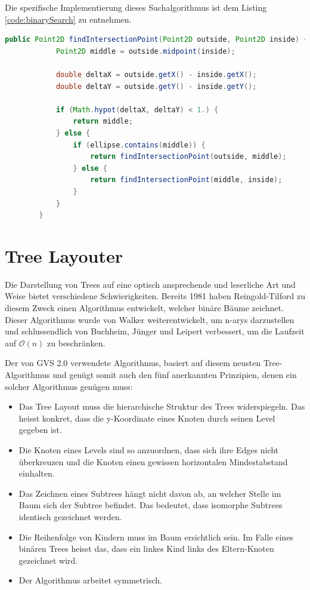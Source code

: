 \documentclass[11pt,a4paper,english,oneside]{book}
\numberwithin{equation}{chapter}
\begin{document}
	\clearpage
	\noindent
	Die spezifische Implementierung dieses Suchalgorithmus ist dem Listing \ref{code:binarySearch} zu entnehmen.
	
	\begin{lstlisting}[language=java, frame=single,caption={Algorithmus Schnittpunkt Suche}, label={code:binarySearch}]
		public Point2D findIntersectionPoint(Point2D outside, Point2D inside) {
			Point2D middle = outside.midpoint(inside);
		
			double deltaX = outside.getX() - inside.getX();
			double deltaY = outside.getY() - inside.getY();
		
			if (Math.hypot(deltaX, deltaY) < 1.) {
				return middle;
			} else {
				if (ellipse.contains(middle)) {
					return findIntersectionPoint(outside, middle);
				} else {
					return findIntersectionPoint(middle, inside);
				}
			}
		}
	\end{lstlisting}



	\section{Tree Layouter} \label{sec:treelayouter}

	Die Darstellung von Trees auf eine optisch ansprechende und leserliche Art und Weise bietet verschiedene Schwierigkeiten. Bereits 1981 haben Reingold-Tilford \cite{reingold-tilford} zu diesem Zweck einen Algorithmus entwickelt, welcher binäre Bäume zeichnet. Dieser Algorithmus wurde von Walker weiterentwickelt, um \glspl{n-ary} darzustellen und schlussendlich von Buchheim, Jünger und Leipert \cite{tree-algorithm} verbessert, um die Laufzeit auf $\mathcal{O}(n)$ zu beschränken. 
	
	Der von GVS 2.0 verwendete Algorithmus, basiert auf diesem neusten Tree-Algorithmus und genügt somit auch den fünf anerkannten Prinzipien, denen ein solcher Algorithmus genügen muss:
	
	\begin{itemize}
		\item Das Tree Layout muss die hierarchische Struktur des Trees widerspiegeln. Das heisst konkret, dass die y-Koordinate eines Knoten durch seinen Level gegeben ist.
		\item Die Knoten eines Levels sind so anzuordnen, dass sich ihre Edges nicht überkreuzen und die Knoten einen gewissen horizontalen Mindestabstand einhalten.
		\item Das Zeichnen eines Subtrees hängt nicht davon ab, an welcher Stelle im Baum sich der Subtree befindet. Das bedeutet, dass \gls{isomorph}e Subtrees identisch gezeichnet werden.
		\item Die Reihenfolge von Kindern muss im Baum ersichtlich sein. Im Falle eines binären Trees heisst das, dass ein linkes Kind links des Eltern-Knoten gezeichnet wird.
		\item Der Algorithmus arbeitet symmetrisch.
	\end{itemize}
	
\end{document}
